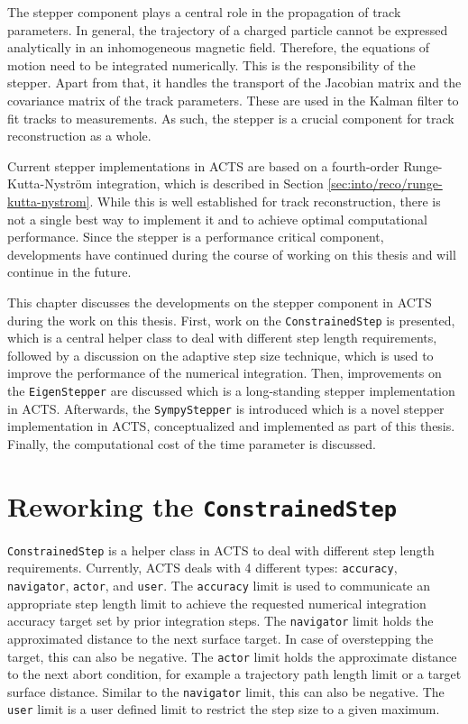 The stepper component plays a central role in the propagation of track parameters. In general, the trajectory of a charged particle cannot be expressed analytically in an inhomogeneous magnetic field. Therefore, the equations of motion need to be integrated numerically. This is the responsibility of the stepper. Apart from that, it handles the transport of the Jacobian matrix and the covariance matrix of the track parameters. These are used in the Kalman filter to fit tracks to measurements. As such, the stepper is a crucial component for track reconstruction as a whole.

Current stepper implementations in ACTS are based on a fourth-order Runge-Kutta-Nyström integration, which is described in Section \ref{sec:into/reco/runge-kutta-nystrom}. While this is well established for track reconstruction, there is not a single best way to implement it and to achieve optimal computational performance. Since the stepper is a performance critical component, developments have continued during the course of working on this thesis and will continue in the future.

This chapter discusses the developments on the stepper component in ACTS during the work on this thesis. First, work on the \texttt{ConstrainedStep} is presented, which is a central helper class to deal with different step length requirements, followed by a discussion on the adaptive step size technique, which is used to improve the performance of the numerical integration. Then, improvements on the \texttt{EigenStepper} are discussed which is a long-standing stepper implementation in ACTS. Afterwards, the \texttt{SympyStepper} is introduced which is a novel stepper implementation in ACTS, conceptualized and implemented as part of this thesis. Finally, the computational cost of the time parameter is discussed.

\section{Reworking the \texttt{ConstrainedStep}}

\texttt{ConstrainedStep} is a helper class in ACTS to deal with different step length requirements. Currently, ACTS deals with 4 different types: \texttt{accuracy}, \texttt{navigator}, \texttt{actor}, and \texttt{user}. The \texttt{accuracy} limit is used to communicate an appropriate step length limit to achieve the requested numerical integration accuracy target set by prior integration steps. The \texttt{navigator} limit holds the approximated distance to the next surface target. In case of overstepping the target, this can also be negative. The \texttt{actor} limit holds the approximate distance to the next abort condition, for example a trajectory path length limit or a target surface distance. Similar to the \texttt{navigator} limit, this can also be negative. The \texttt{user} limit is a user defined limit to restrict the step size to a given maximum.

